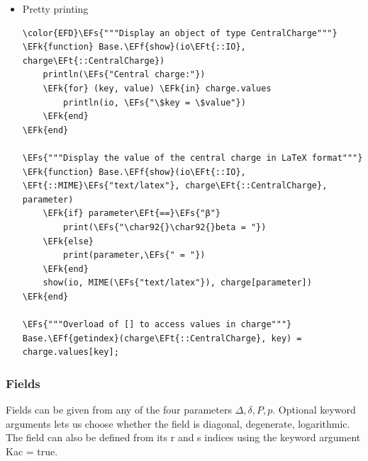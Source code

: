 \documentclass[a4paper]{article}
\numberwithin{equation}{section}
\newcommand{\EFs}[1]{\textcolor{EFs}{#1}} %
\newcommand{\EFk}[1]{\textcolor{EFk}{#1}} %
\newcommand{\EFf}[1]{\textcolor{EFf}{#1}} %
\newcommand{\EFt}[1]{\textcolor{EFt}{#1}} %
\begin{document}
\begin{itemize}
\item Pretty printing
\label{sec:orgf93c64e}

\begin{Code}
\begin{Verbatim}
\color{EFD}\EFs{"""Display an object of type CentralCharge"""}
\EFk{function} Base.\EFf{show}(io\EFt{::IO}, charge\EFt{::CentralCharge})
    println(\EFs{"Central charge:"})
    \EFk{for} (key, value) \EFk{in} charge.values
        println(io, \EFs{"\$key = \$value"})
    \EFk{end}
\EFk{end}

\EFs{"""Display the value of the central charge in LaTeX format"""}
\EFk{function} Base.\EFf{show}(io\EFt{::IO}, \EFt{::MIME}\EFs{"text/latex"}, charge\EFt{::CentralCharge}, parameter)
    \EFk{if} parameter\EFt{==}\EFs{"β"}
        print(\EFs{"\char92{}\char92{}beta = "})
    \EFk{else}
        print(parameter,\EFs{" = "})
    \EFk{end}
    show(io, MIME(\EFs{"text/latex"}), charge[parameter])
\EFk{end}

\EFs{"""Overload of [] to access values in charge"""}
Base.\EFf{getindex}(charge\EFt{::CentralCharge}, key) = charge.values[key];
\end{Verbatim}
\end{Code}
\end{itemize}
\subsubsection*{Fields}
\label{sec:org744e8a7}

Fields can be given from any of the four parameters \(\Delta, \delta, P, p\). Optional keyword arguments lets us choose whether the field is diagonal, degenerate, logarithmic. The field can also be defined from its r and s indices using the keyword argument Kac = true.
\end{document}
